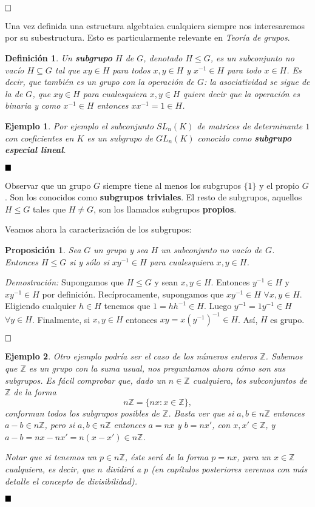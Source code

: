 \documentclass[12pt]{article}
\newtheorem{proposition}[theorem]{Proposición}
\newtheorem{definition}[theorem]{Definición}
\newtheorem{example}{Ejemplo}[theorem]
\begin{document}
$\hfill \square$

Una vez definida una estructura algebtaica cualquiera siempre nos interesaremos por su subestructura. Esto es particularmente relevante en \textit{Teoría de grupos}.

\begin{definition}Un \textbf{subgrupo} $H$ de $G$, denotado $H \leq G$, es un subconjunto no vacío $H \subseteq G$ tal que $xy \in H$ para todos $x,y \in H$ y $x^{-1} \in H$ para todo $x \in H$. Es decir, que también es un grupo con la operación de $G$: la asociatividad se sigue de la de $G$, que $xy \in H$ para cualesquiera $x,y \in H$ quiere decir que la operación es binaria y como $x^{-1} \in H$ entonces $xx^{-1} = 1 \in H$.
\end{definition}

\begin{example}Por ejemplo el subconjunto $SL_{n}(K)$ de matrices de determinante $1$ con coeficientes en $K$ es un subgrupo de $GL_n(K)$ conocido como \textbf{subgrupo especial lineal}.
\end{example}
$\hfill \blacksquare$

Observar que un grupo $G$ siempre tiene al menos los subgrupos $ \lbrace 1 \rbrace$ y el propio $G$. Son los conocidos como \textbf{subgrupos triviales}. El resto de subgrupos, aquellos $H \leq G $ tales que $H \neq G$, son los llamados subgrupos \textbf{propios}.

Veamos ahora la caracterización de los subgrupos: 

\begin{proposition}Sea $G$ un grupo y sea $H$ un subconjunto no vacío de $G$. Entonces $H \leq G$ si y sólo si $xy^{-1} \in H$ para cualesquiera $x,y \in H$.
\end{proposition}
\emph{Demostración: }
Supongamos que $H \leq G$ y sean $x,y \in H$. Entonces $y^{-1} \in H$ y $xy^{-1} \in H$ por definición. Recíprocamente, supongamos que $xy^{-1} \in H$ $\forall x,y \in H$. Eligiendo cualquier $h \in H$ tenemos que $1 = h h^{-1} \in H$. Luego $y^{-1} = 1y^{-1} \in H$ $\forall y \in H$. Finalmente, si $x,y \in H$ entonces $xy = x(y^{-1})^{-1} \in H$. Así, $H$ es grupo.

$\hfill \square$

\begin{example}Otro ejemplo podría ser el caso de los números enteros $\mathbb{Z}$. Sabemos que $\mathbb{Z}$ es un grupo con la suma usual, nos preguntamos ahora cómo son sus subgrupos. Es fácil comprobar que, dado un $n\in \mathbb{Z}$ cualquiera, los subconjuntos de $\mathbb{Z}$ de la forma $$n\mathbb{Z} = \lbrace nx: x \in \mathbb{Z} \rbrace,$$ conforman todos los subgrupos posibles de $\mathbb{Z}$. Basta ver que si $a,b \in n\mathbb{Z}$ entonces $a-b \in n\mathbb{Z}$, pero si $a,b\in n\mathbb{Z}$ entonces $a=nx $ y $b = nx'$, con $x,x' \in \mathbb{Z}$, y $a-b = nx -nx' = n(x-x') \in n\mathbb{Z}$.

Notar que si tenemos un $p \in n\mathbb{Z}$, éste será de la forma $p = nx$, para un $x \in \mathbb{Z}$ cualquiera, es decir, que $n$ dividirá a $p$ (en capítulos posteriores veremos con más detalle el concepto de divisibilidad).
\end{example}
$\hfill \blacksquare$
\end{document}
